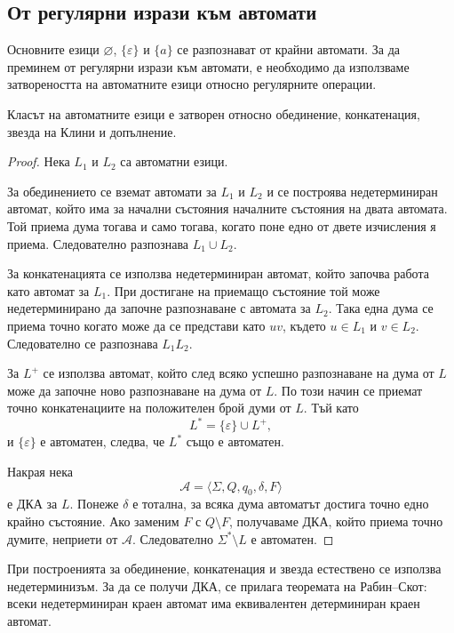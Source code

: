 \subsection{От регулярни изрази към автомати}\label{s:4.3.1}

Основните езици $\varnothing$, $\{\varepsilon\}$ и $\{a\}$ се разпознават от крайни автомати. За да преминем от регулярни изрази към автомати, е необходимо да използваме затвореността на автоматните езици относно регулярните операции.

\begin{thm}
Класът на автоматните езици е затворен относно обединение, конкатенация, звезда на Клини и допълнение.
\end{thm}

\begin{proof}
Нека $L_1$ и $L_2$ са автоматни езици.

За обединението се вземат автомати за $L_1$ и $L_2$ и се построява недетерминиран автомат, който има за начални състояния началните състояния на двата автомата. Той приема дума тогава и само тогава, когато поне едно от двете изчисления я приема. Следователно разпознава $L_1\cup L_2$.

За конкатенацията се използва недетерминиран автомат, който започва работа като автомат за $L_1$. При достигане на приемащо състояние той може недетерминирано да започне разпознаване с автомата за $L_2$. Така една дума се приема точно когато може да се представи като $uv$, където $u\in L_1$ и $v\in L_2$. Следователно се разпознава $L_1L_2$.

За $L^+$ се използва автомат, който след всяко успешно разпознаване на дума от $L$ може да започне ново разпознаване на дума от $L$. По този начин се приемат точно конкатенациите на положителен брой думи от $L$. Тъй като
\[
L^*=\{\varepsilon\}\cup L^+,
\]
и $\{\varepsilon\}$ е автоматен, следва, че $L^*$ също е автоматен.

Накрая нека
\[
\mathcal A=\langle\Sigma,Q,q_0,\delta,F\rangle
\]
е ДКА за $L$. Понеже $\delta$ е тотална, за всяка дума автоматът достига точно едно крайно състояние. Ако заменим $F$ с $Q\setminus F$, получаваме ДКА, който приема точно думите, неприети от $\mathcal A$. Следователно $\Sigma^*\setminus L$ е автоматен.
\end{proof}

\begin{supp}[Бележка]
При построенията за обединение, конкатенация и звезда естествено се използва недетерминизъм. За да се получи ДКА, се прилага теоремата на Рабин--Скот: всеки недетерминиран краен автомат има еквивалентен детерминиран краен автомат.
\end{supp}

